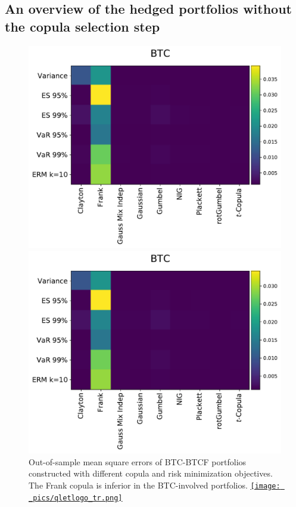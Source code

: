 \documentclass[11pt,a4paper,english]{article}
\begin{document}
\subsection{An overview of the hedged portfolios without the copula
  selection step}
\label{subsec:HP1}
  \begin{figure}[t]
    \centering
    \begin{minipage}[t]{.475\textwidth}
        \centering
        \includegraphics[width=\textwidth]{_pics/MSE_BTC.pdf}
      \caption{Out-of-sample mean square errors of BTC-BTCF portfolios constructed with different copula and risk minimization objectives.
        The Frank copula is inferior in the BTC-involved portfolios.
        \href{https://github.com/QuantLet/Hedging-Cryptos-with-Bitcoin-Futures/blob/main/newToQuantlet/Pynotebooks/figures/figure 6_7_8_9_10_11.ipynb}{\texttt{[image: \_pics/qletlogo\_tr.png]}} }
        \label{fig:MSE_BTC}
    \end{minipage}
    \hfill
    \begin{minipage}[t]{.475\textwidth}
        \centering
        \includegraphics[width=\textwidth]{_pics/semiLowerVariance_BTC.pdf}

\end{minipage}
\end{figure}
\end{document}
